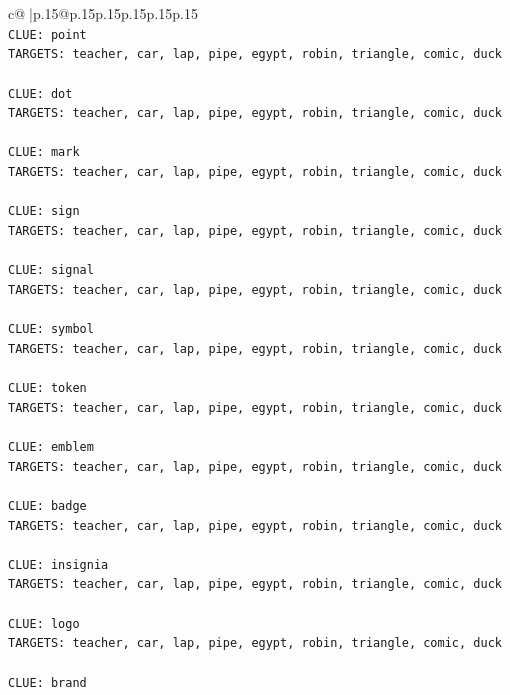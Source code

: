 \documentclass{article}
\begin{document}
{\begin{supertabular}{c@{$\;$}|p{.15\linewidth}@{}p{.15\linewidth}p{.15\linewidth}p{.15\linewidth}p{.15\linewidth}p{.15\linewidth}}
{{{\\ 
\texttt{CLUE: point} \\
\texttt{TARGETS: teacher, car, lap, pipe, egypt, robin, triangle, comic, duck} \\
\\ 
\texttt{CLUE: dot} \\
\texttt{TARGETS: teacher, car, lap, pipe, egypt, robin, triangle, comic, duck} \\
\\ 
\texttt{CLUE: mark} \\
\texttt{TARGETS: teacher, car, lap, pipe, egypt, robin, triangle, comic, duck} \\
\\ 
\texttt{CLUE: sign} \\
\texttt{TARGETS: teacher, car, lap, pipe, egypt, robin, triangle, comic, duck} \\
\\ 
\texttt{CLUE: signal} \\
\texttt{TARGETS: teacher, car, lap, pipe, egypt, robin, triangle, comic, duck} \\
\\ 
\texttt{CLUE: symbol} \\
\texttt{TARGETS: teacher, car, lap, pipe, egypt, robin, triangle, comic, duck} \\
\\ 
\texttt{CLUE: token} \\
\texttt{TARGETS: teacher, car, lap, pipe, egypt, robin, triangle, comic, duck} \\
\\ 
\texttt{CLUE: emblem} \\
\texttt{TARGETS: teacher, car, lap, pipe, egypt, robin, triangle, comic, duck} \\
\\ 
\texttt{CLUE: badge} \\
\texttt{TARGETS: teacher, car, lap, pipe, egypt, robin, triangle, comic, duck} \\
\\ 
\texttt{CLUE: insignia} \\
\texttt{TARGETS: teacher, car, lap, pipe, egypt, robin, triangle, comic, duck} \\
\\ 
\texttt{CLUE: logo} \\
\texttt{TARGETS: teacher, car, lap, pipe, egypt, robin, triangle, comic, duck} \\
\\ 
\texttt{CLUE: brand} \\
}}}
\end{supertabular}}
\end{document}
